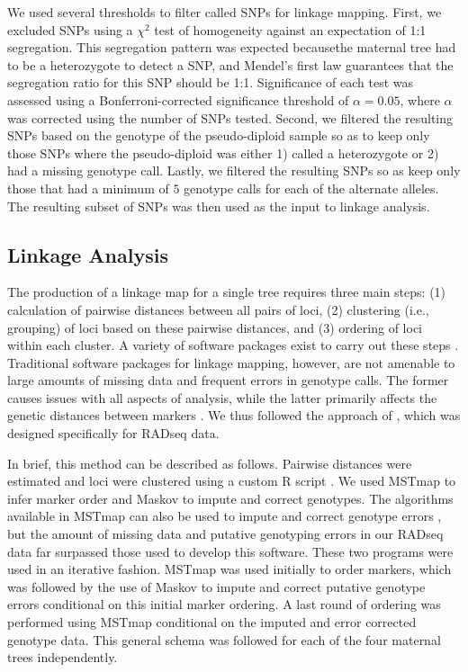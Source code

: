 \documentclass[11pt]{article}
\begin{document}
We used several thresholds to filter called SNPs for linkage mapping. First, 
we excluded SNPs using a $\chi^2$ test of homogeneity against an expectation of 1:1 segregation. This segregation 
pattern was expected becausethe maternal tree had to be a heterozygote to detect a SNP, and Mendel's first law 
guarantees that the segregation ratio for this SNP should be 1:1. Significance of each test was 
assessed using a Bonferroni-corrected significance threshold of $\alpha = 0.05$, where $\alpha$ was corrected using the 
number of SNPs tested. Second, we filtered the resulting SNPs based on the genotype of the pseudo-diploid sample so as 
to keep only those SNPs where the pseudo-diploid was either 1) called a heterozygote or 2) had a missing genotype call.
Lastly, we filtered the resulting SNPs so as keep only those that had a minimum of $5$ genotype calls for each of the 
alternate alleles. The resulting subset of SNPs was then used as the input to linkage analysis. 

\subsection*{Linkage Analysis}\label{ss:linkage}
The production of a linkage map for a single tree requires three main steps: (1) calculation of 
pairwise distances between all pairs of loci, (2) clustering (i.e., grouping) of loci based on these pairwise distances, 
and (3) ordering of loci within each cluster.  A variety of software packages exist to carry out these steps 
\citep[e.g.,][]{VanOoijen:2011}. Traditional software packages for linkage mapping, however, are not amenable to large 
amounts of missing data and frequent errors in genotype calls. The former causes issues with all aspects of analysis, while 
the latter primarily affects the genetic distances between markers \citep{Cartwright:2007}. We thus followed the approach 
of \citet{Ward:2013}, which was designed specifically for RADseq data. 

In brief, this method can be described as follows. Pairwise distances were estimated and loci were clustered using a 
custom R script \citep[see File S2;][]{R:2013}. We used MSTmap \citep{Wu:2008a} 
to infer marker order and Maskov \citep{Ward:2013} to impute and correct genotypes. The algorithms available
in MSTmap can also be used to impute and correct genotype errors \citep[see][]{Wu:2008a}, but the amount of missing
data and putative genotyping errors in our RADseq data far surpassed those used to develop this software. These two programs
were used in an iterative fashion. MSTmap was used initially to order markers, which was followed by the use of Maskov
to impute and correct putative genotype errors conditional on this initial marker ordering. A last round of ordering 
was performed using MSTmap conditional on the imputed and error corrected genotype data. This general schema
was followed for each of the four maternal trees independently.
\end{document}
